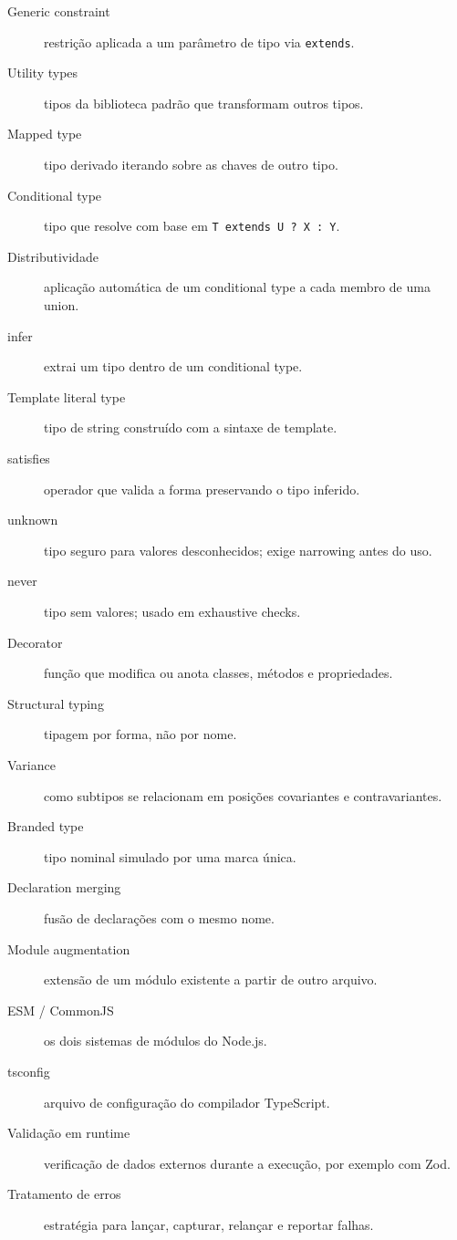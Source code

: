\documentclass[12pt,a4paper,oneside]{book}
\newcommand{\code}[1]{\texttt{#1}}
\begin{document}
\begin{description}
  \item[Generic constraint] restrição aplicada a um parâmetro de tipo via \code{extends}.
  \item[Utility types] tipos da biblioteca padrão que transformam outros tipos.
  \item[Mapped type] tipo derivado iterando sobre as chaves de outro tipo.
  \item[Conditional type] tipo que resolve com base em \code{T extends U ? X : Y}.
  \item[Distributividade] aplicação automática de um conditional type a cada membro de uma union.
  \item[infer] extrai um tipo dentro de um conditional type.
  \item[Template literal type] tipo de string construído com a sintaxe de template.
  \item[satisfies] operador que valida a forma preservando o tipo inferido.
  \item[unknown] tipo seguro para valores desconhecidos; exige narrowing antes do uso.
  \item[never] tipo sem valores; usado em exhaustive checks.
  \item[Decorator] função que modifica ou anota classes, métodos e propriedades.
  \item[Structural typing] tipagem por forma, não por nome.
  \item[Variance] como subtipos se relacionam em posições covariantes e contravariantes.
  \item[Branded type] tipo nominal simulado por uma marca única.
  \item[Declaration merging] fusão de declarações com o mesmo nome.
  \item[Module augmentation] extensão de um módulo existente a partir de outro arquivo.
  \item[ESM / CommonJS] os dois sistemas de módulos do Node.js.
  \item[tsconfig] arquivo de configuração do compilador TypeScript.
  \item[Validação em runtime] verificação de dados externos durante a execução, por exemplo com Zod.
  \item[Tratamento de erros] estratégia para lançar, capturar, relançar e reportar falhas.
\end{description}
\end{document}
